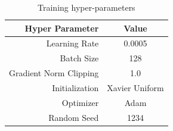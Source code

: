 \begin{table}[h!]
 \caption{Training hyper-parameters}
 \label{tab:table2}
  \begin{center}
\begin{tabular}{rc} 
\toprule
\textbf{Hyper Parameter} & \textbf{Value}  \\ 
\toprule
Learning Rate            & 0.0005          \\
Batch Size               & 128             \\
Gradient Norm Clipping   & 1.0             \\
Initialization           & Xavier Uniform  \\
Optimizer                & Adam            \\
Random Seed              & 1234            \\
\toprule
\end{tabular}
  \end{center}
\end{table}